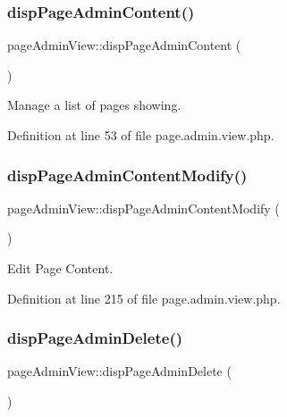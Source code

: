 \subsubsection{\texorpdfstring{disp\+Page\+Admin\+Content()}{dispPageAdminContent()}}
{\footnotesize\ttfamily page\+Admin\+View\+::disp\+Page\+Admin\+Content (\begin{DoxyParamCaption}{ }\end{DoxyParamCaption})}



Manage a list of pages showing. 



Definition at line 53 of file page.\+admin.\+view.\+php.

\hypertarget{classpageAdminView_a3396afbab0397643febdf26626c04199}{}\label{classpageAdminView_a3396afbab0397643febdf26626c04199} 
\subsubsection{\texorpdfstring{disp\+Page\+Admin\+Content\+Modify()}{dispPageAdminContentModify()}}
{\footnotesize\ttfamily page\+Admin\+View\+::disp\+Page\+Admin\+Content\+Modify (\begin{DoxyParamCaption}{ }\end{DoxyParamCaption})}



Edit Page Content. 



Definition at line 215 of file page.\+admin.\+view.\+php.

\hypertarget{classpageAdminView_afd16fd9dd0c023d73bec88649ed843f9}{}\label{classpageAdminView_afd16fd9dd0c023d73bec88649ed843f9} 
\subsubsection{\texorpdfstring{disp\+Page\+Admin\+Delete()}{dispPageAdminDelete()}}
{\footnotesize\ttfamily page\+Admin\+View\+::disp\+Page\+Admin\+Delete (\begin{DoxyParamCaption}{ }\end{DoxyParamCaption})}



